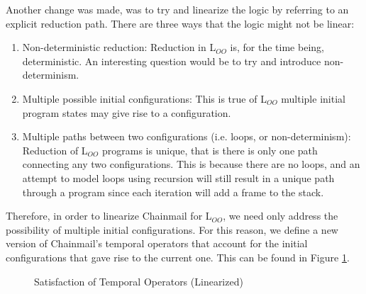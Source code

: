 \documentclass[12pt]{article}
\begin{document}
Another change was made, was to try and linearize the logic by referring to an explicit reduction path. There are three ways that the logic might not be linear:
\begin{enumerate}
\item
Non-deterministic reduction: Reduction in L$_{OO}$ is, for the time being, deterministic. An interesting question would be to try and introduce non-determinism.
\item
Multiple possible initial configurations: This is true of L$_{OO}$ multiple initial program states may give rise to a configuration.
\item
Multiple paths between two configurations (i.e. loops, or non-determinism): 
Reduction of L$_{OO}$ programs is unique, that is there is only one path connecting any two configurations. This is because there are no loops, and an attempt to model loops using recursion will still result in a unique path through a program since each iteration will add a frame to the stack.
\end{enumerate}
Therefore, in order to linearize Chainmail for L$_{OO}$, we need only address the possibility of multiple initial configurations. For this reason, we define a new version of Chainmail's temporal operators that account for the initial configurations that gave rise to the current one. This can be found in Figure \ref{f:sat_temporal_linear}.

\begin{figure}
\caption{Satisfaction of Temporal Operators (Linearized)}
\label{f:sat_temporal_linear}
\end{figure}
\end{document}
